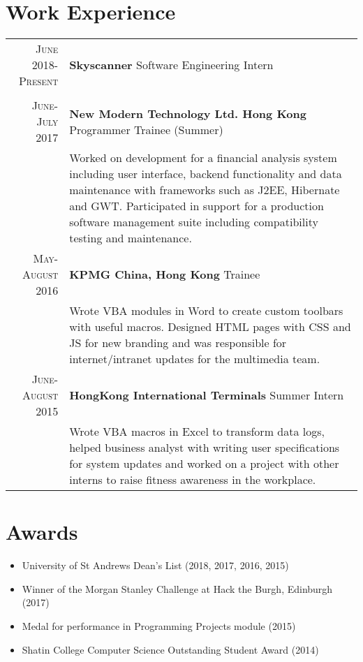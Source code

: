 \documentclass{article}
\newcommand{\n}[0]{\\[\baselineskip]}
\begin{document}
\section*{Work Experience}
\begin{tabular}{r|p{16cm}}

\textsc{June 2018-Present} & \textbf{Skyscanner} Software Engineering Intern \\

&\footnotesize{}\n

\textsc{June-July 2017} & \textbf{New Modern Technology Ltd. Hong Kong} Programmer Trainee (Summer) \\

&\footnotesize{Worked on development for a financial analysis system including user interface, backend functionality and data maintenance with frameworks such as J2EE, Hibernate and GWT. Participated in support for a production software management suite including compatibility testing and maintenance.}\n


\textsc{May-August 2016} & \textbf{KPMG China, Hong Kong} Trainee \\
 
&\footnotesize{Wrote VBA modules in Word to create custom toolbars with useful macros. Designed HTML pages with CSS and JS for new branding and was responsible for internet/intranet updates for the multimedia team.}\n

\textsc{June-August 2015} & \textbf{HongKong International Terminals} Summer Intern\\

&\footnotesize{Wrote VBA macros in Excel to transform data logs, helped business analyst with writing user specifications for system updates and worked on a project with other interns to raise fitness awareness in the workplace.}\\

\end{tabular}

\section*{Awards}
\setlength\multicolsep{0pt}
\begin{multicols}{2}
\begin{itemize}
\item University of St Andrews Dean's List (2018, 2017, 2016, 2015)
\item Winner of the Morgan Stanley Challenge at Hack the Burgh, Edinburgh (2017)
\end{itemize}
\columnbreak
\begin{itemize}
\item Medal for performance in Programming Projects module (2015)
\item Shatin College Computer Science Outstanding Student Award (2014)
\end{itemize}
\end{multicols}
\end{document}
